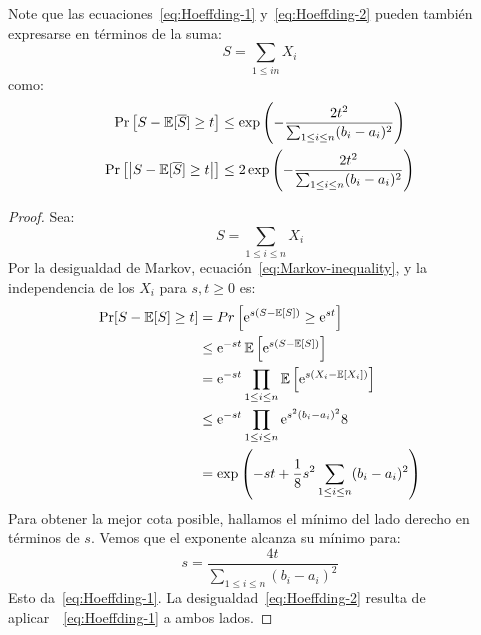  Note que las ecuaciones~\eqref{eq:Hoeffding-1} y~\eqref{eq:Hoeffding-2}
  pueden también expresarse en términos de la suma:
  \begin{equation*}
    S
      = \sum_{1 \le i n} X_i
  \end{equation*}
  como:
  \begin{align}
    \Pr\left[ S - \operatorname{\mathbb{E}}[ \overline{S} ] \ge t \right]
      &\le \exp\left(
                  - \frac{2 t^2}{\sum_{1 \le i \le n} (b_i - a_i)^2}
               \right)
         \label{eq:Hoeffding-sum-1} \\
    \Pr\left[\left\lvert
               S - \operatorname{\mathbb{E}}[ \overline{S} ] \ge t \right\rvert\right]
      &\le 2 \exp\left(
                    - \frac{2 t^2}{\sum_{1 \le i \le n} (b_i - a_i)^2}
                 \right)
         \label{eq:Hoeffding-sum-2}
  \end{align}
  \begin{proof}
    Sea:
    \begin{equation*}
      S
        = \sum_{1 \le i \le n} X_i
    \end{equation*}
    Por la desigualdad de Markov,
    ecuación~\eqref{eq:Markov-inequality},
    y la independencia de los \(X_i\)
    para \(s, t \ge 0\) es:
    \begin{align*}
      \Pr[ S - \operatorname{\mathbb{E}}[S] \ge t]
        &=   Pr\left[
                  \mathrm{e}^{s (S - \operatorname{\mathbb{E}}[S])} \ge \mathrm{e}^{s t}
                \right] \\
        &\le \mathrm{e}^{-s t}
               \operatorname{\mathbb{E}}\left[
                      \mathrm{e}^{s(S - \operatorname{\mathbb{E}}[S])}
                   \right] \\
        &=   \mathrm{e}^{-s t}
               \prod_{1 \le i \le n}
                 \operatorname{\mathbb{E}}\left[
                        \mathrm{e}^{s(X_i - \operatorname{\mathbb{E}}[X_i])}
                     \right] \\
        &\le \mathrm{e}^{-s t}
               \prod_{1 \le i \le n}
                  \mathrm{e}^{s^2 (b_i - a_i)^2}{8} \\
        &=   \exp\left(
                    -st + \frac{1}{8} s^2 \sum_{1 \le i \le n} (b_i - a_i)^2
                 \right)
    \end{align*}
    Para obtener la mejor cota posible,
    hallamos el mínimo del lado derecho en términos de \(s\).
    Vemos que el exponente alcanza su mínimo para:
    \begin{equation*}
      s
        = \frac{4 t}{\sum_{1 \le i \le n} (b_i - a_i)^2}
    \end{equation*}
    Esto da~\eqref{eq:Hoeffding-1}.
    La desigualdad~\eqref{eq:Hoeffding-2}
    resulta de aplicar~~\eqref{eq:Hoeffding-1}
    a ambos lados.
  \end{proof}

